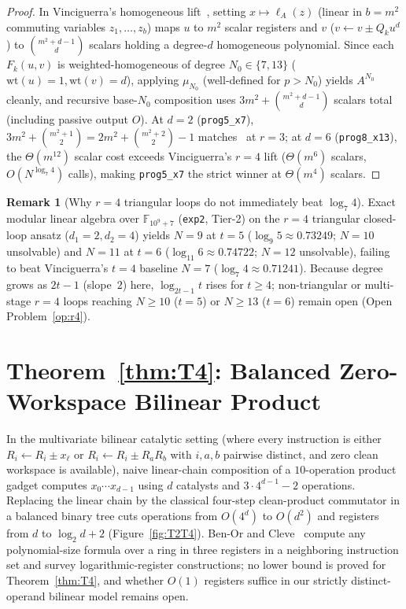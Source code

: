 \documentclass[11pt,reqno]{amsart}
\theoremstyle{definition}
\newtheorem{remark}[theorem]{Remark}
\newcommand{\F}{\mathbb{F}}
\begin{document}
\begin{proof}
In Vinciguerra's homogeneous lift~\cite[\S4.4]{Vinciguerra2026}, setting $x \mapsto \ell_A(z)$ (linear in $b = m^2$ commuting variables $z_1, \dots, z_b$) maps $u$ to $m^2$ scalar registers and $v$ ($v \leftarrow v \pm Q_k u^d$) to $\binom{m^2 + d - 1}{d}$ scalars holding a degree-$d$ homogeneous polynomial.
Since each $F_k(u, v)$ is weighted-homogeneous of degree $N_0 \in \{7, 13\}$ ($\mathrm{wt}(u) = 1, \mathrm{wt}(v) = d$), applying $\mu_{N_0}$ (well-defined for $p > N_0$) yields $A^{N_0}$ cleanly, and recursive base-$N_0$ composition uses $3m^2 + \binom{m^2+d-1}{d}$ scalars total (including passive output $O$).
At $d = 2$ (\texttt{prog5\_x7}), $3m^2 + \binom{m^2+1}{2} = 2m^2 + \binom{m^2+2}{2} - 1$ matches~\cite[Thm.~5.2]{Vinciguerra2026} at $r = 3$; at $d = 6$ (\texttt{prog8\_x13}), the $\Theta(m^{12})$ scalar cost exceeds Vinciguerra's $r = 4$ lift ($\Theta(m^6)$ scalars, $O(N^{\log_7 4})$ calls), making \texttt{prog5\_x7} the strict winner at $\Theta(m^4)$ scalars.
\end{proof}

\begin{remark}[Why $r = 4$ triangular loops do not immediately beat $\log_7 4$]
Exact modular linear algebra over $\F_{10^9 + 7}$ (\texttt{exp2}, Tier-2) on the $r = 4$ triangular closed-loop ansatz ($d_1 = 2, d_2 = 4$) yields $N = 9$ at $t = 5$ ($\log_9 5 \approx 0.73249$; $N = 10$ unsolvable) and $N = 11$ at $t = 6$ ($\log_{11} 6 \approx 0.74722$; $N = 12$ unsolvable), failing to beat Vinciguerra's $t = 4$ baseline $N = 7$ ($\log_7 4 \approx 0.71241$).
Because degree grows as $2t - 1$ (slope~$2$) here, $\log_{2t-1} t$ rises for $t \ge 4$; non-triangular or multi-stage $r = 4$ loops reaching $N \ge 10$ ($t = 5$) or $N \ge 13$ ($t = 6$) remain open (Open Problem~\ref{op:r4}).
\end{remark}

\section{Theorem~\ref{thm:T4}: Balanced Zero-Workspace Bilinear Product}
\label{sec:T4}

In the multivariate bilinear catalytic setting (where every instruction is either $R_i \leftarrow R_i \pm x_\ell$ or $R_i \leftarrow R_i \pm R_a R_b$ with $i, a, b$ pairwise distinct, and zero clean workspace is available), naive linear-chain composition of a $10$-operation product gadget computes $x_0 \cdots x_{d-1}$ using $d$ catalysts and $3 \cdot 4^{d-1} - 2$ operations.
Replacing the linear chain by the classical four-step clean-product commutator in a balanced binary tree cuts operations from $O(4^d)$ to $O(d^2)$ and registers from $d$ to $\log_2 d + 2$ (Figure~\ref{fig:T2T4}).
Ben-Or and Cleve~\cite{BenOrCleve1992} compute any polynomial-size formula over a ring in three registers in a neighboring instruction set and survey logarithmic-register constructions; no lower bound is proved for Theorem~\ref{thm:T4}, and whether $O(1)$ registers suffice in our strictly distinct-operand bilinear model remains open.
\end{document}
